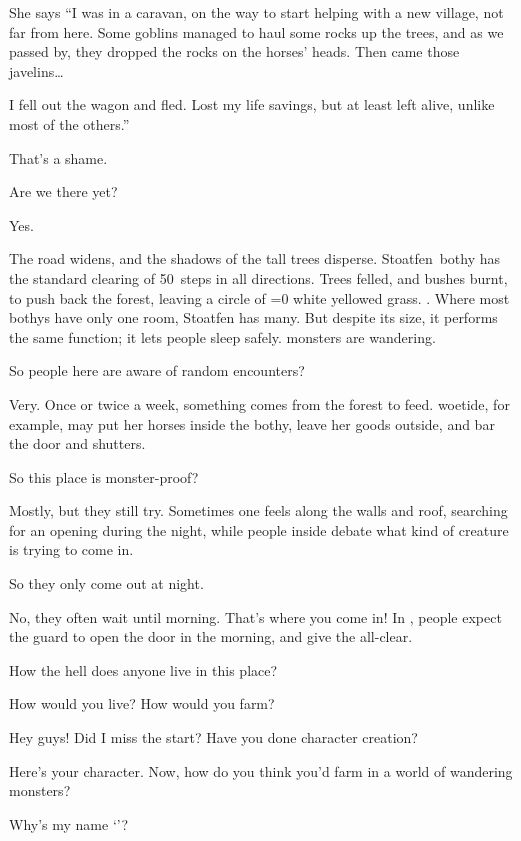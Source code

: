 \begin{multicols}{2}
\begin{description}
  She says
  ``I was in a caravan, on the way to start helping with a new \gls{village}, not far from here.
  Some goblins managed to haul some rocks up the trees, and as we passed by, they dropped the rocks on the horses' heads.
  Then came those javelins\ldots

  I fell out the wagon and fled.
  Lost my life savings, but at least left alive, unlike most of the others.''

  \item[Player 1:]
  That's a shame.
  \item[Player 2:]
  Are we there yet?
  \item[\Glsentrytext{gm}:]
  Yes.

  The road widens, and the shadows of the tall trees disperse.
  Stoatfen~\Gls{bothy} has the standard clearing of 50~\glspl{step} in all directions.
  Trees felled, and bushes burnt, to push back the forest, leaving a circle of
  \ifnum\value{temperature}=0%
    white%
  \else%
    yellowed grass.
  \fi.%
  Where most \glspl{bothy} have only one room, Stoatfen has many.
  But despite its size, it performs the same function; it lets people sleep safely.
  \Glspl{monster} are wandering.
  \item[Player 1:]
  So people here are aware of random encounters?
  \item[\Glsentrytext{gm}:]
  Very.
  Once or twice a week, something comes from the forest to feed.
  \Gls{woetide}, for example, may put her horses inside the \gls{bothy}, leave her goods outside, and bar the door and shutters.
  \item[Player 2:]
  So this place is \gls{monster}-proof?
  \item[\Glsentrytext{gm}:]
  Mostly, but they still try.
  Sometimes one feels along the walls and roof, searching for an opening during the night, while people inside debate what kind of creature is trying to come in.
  \item[Player 1:]
  So they only come out at night.
  \item[\Glsentrytext{gm}:]
  No, they often wait until morning.
  That's where you come in!
  In , people expect the \gls{guard} to open the door in the morning, and give the all-clear.
  \item[Player 2:]
  How the hell does anyone live in this place?
  \item[\Glsentrytext{gm}:]
  How would you live?
  How would you farm?
  \item[Player 3:]
  Hey guys!
  Did I miss the start?
  Have you done character creation?
  \item[\Glsentrytext{gm}:]
  Here's your character.
  Now, how do you think you'd farm in a world of wandering monsters?
  \item[Player 3:]
  Why's my name `\composeHumanName'?
\end{description}


\end{multicols}
